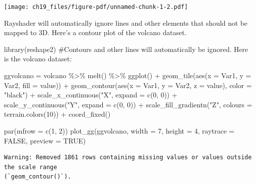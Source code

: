 \documentclass[
  letterpaper,
  DIV=11,
  numbers=noendperiod]{scrreprt}
\newenvironment{Shaded}{\begin{snugshade}}{\end{snugshade}}
\newcommand{\AttributeTok}[1]{\textcolor[rgb]{0.40,0.45,0.13}{#1}}
\newcommand{\CommentTok}[1]{\textcolor[rgb]{0.37,0.37,0.37}{#1}}
\newcommand{\ConstantTok}[1]{\textcolor[rgb]{0.56,0.35,0.01}{#1}}
\newcommand{\DecValTok}[1]{\textcolor[rgb]{0.68,0.00,0.00}{#1}}
\newcommand{\FunctionTok}[1]{\textcolor[rgb]{0.28,0.35,0.67}{#1}}
\newcommand{\NormalTok}[1]{\textcolor[rgb]{0.00,0.23,0.31}{#1}}
\newcommand{\OtherTok}[1]{\textcolor[rgb]{0.00,0.23,0.31}{#1}}
\newcommand{\SpecialCharTok}[1]{\textcolor[rgb]{0.37,0.37,0.37}{#1}}
\newcommand{\StringTok}[1]{\textcolor[rgb]{0.13,0.47,0.30}{#1}}
\begin{document}
\texttt{[image: ch19\_files/figure-pdf/unnamed-chunk-1-2.pdf]}

Rayshader will automatically ignore lines and other elements that should
not be mapped to 3D. Here's a contour plot of the volcano dataset.

\begin{Shaded}
\begin{Highlighting}[]
\FunctionTok{library}\NormalTok{(reshape2)}
\CommentTok{\#Contours and other lines will automatically be ignored. Here is the volcano dataset:}

\NormalTok{ggvolcano }\OtherTok{=}\NormalTok{ volcano }\SpecialCharTok{\%\textgreater{}\%} 
  \FunctionTok{melt}\NormalTok{() }\SpecialCharTok{\%\textgreater{}\%}
  \FunctionTok{ggplot}\NormalTok{() }\SpecialCharTok{+}
  \FunctionTok{geom\_tile}\NormalTok{(}\FunctionTok{aes}\NormalTok{(}\AttributeTok{x =}\NormalTok{ Var1, }\AttributeTok{y =}\NormalTok{ Var2, }\AttributeTok{fill =}\NormalTok{ value)) }\SpecialCharTok{+}
  \FunctionTok{geom\_contour}\NormalTok{(}\FunctionTok{aes}\NormalTok{(}\AttributeTok{x =}\NormalTok{ Var1, }\AttributeTok{y =}\NormalTok{ Var2, }\AttributeTok{z =}\NormalTok{ value), }\AttributeTok{color =} \StringTok{"black"}\NormalTok{) }\SpecialCharTok{+}
  \FunctionTok{scale\_x\_continuous}\NormalTok{(}\StringTok{"X"}\NormalTok{, }\AttributeTok{expand =} \FunctionTok{c}\NormalTok{(}\DecValTok{0}\NormalTok{, }\DecValTok{0}\NormalTok{)) }\SpecialCharTok{+}
  \FunctionTok{scale\_y\_continuous}\NormalTok{(}\StringTok{"Y"}\NormalTok{, }\AttributeTok{expand =} \FunctionTok{c}\NormalTok{(}\DecValTok{0}\NormalTok{, }\DecValTok{0}\NormalTok{)) }\SpecialCharTok{+}
  \FunctionTok{scale\_fill\_gradientn}\NormalTok{(}\StringTok{"Z"}\NormalTok{, }\AttributeTok{colours =} \FunctionTok{terrain.colors}\NormalTok{(}\DecValTok{10}\NormalTok{)) }\SpecialCharTok{+}
  \FunctionTok{coord\_fixed}\NormalTok{()}

\FunctionTok{par}\NormalTok{(}\AttributeTok{mfrow =} \FunctionTok{c}\NormalTok{(}\DecValTok{1}\NormalTok{, }\DecValTok{2}\NormalTok{))}
\FunctionTok{plot\_gg}\NormalTok{(ggvolcano, }\AttributeTok{width =} \DecValTok{7}\NormalTok{, }\AttributeTok{height =} \DecValTok{4}\NormalTok{, }\AttributeTok{raytrace =} \ConstantTok{FALSE}\NormalTok{, }\AttributeTok{preview =} \ConstantTok{TRUE}\NormalTok{)}
\end{Highlighting}
\end{Shaded}

\begin{verbatim}
Warning: Removed 1861 rows containing missing values or values outside the scale range
(`geom_contour()`).
\end{verbatim}
\end{document}
